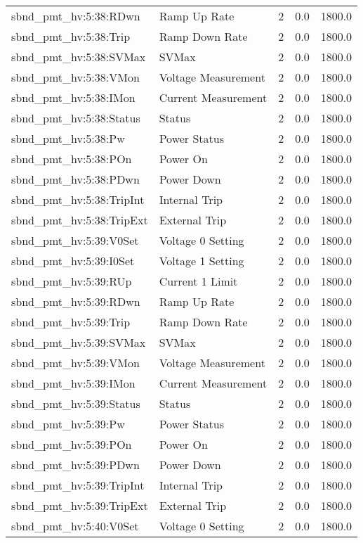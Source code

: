 \begin{center}
\begin{longtable}{l | l l l l }
sbnd\_pmt\_hv:5:38:RDwn & Ramp Up Rate & 2 & 0.0 & 1800.0\\ 
sbnd\_pmt\_hv:5:38:Trip & Ramp Down Rate & 2 & 0.0 & 1800.0\\ 
sbnd\_pmt\_hv:5:38:SVMax & SVMax & 2 & 0.0 & 1800.0\\ 
sbnd\_pmt\_hv:5:38:VMon & Voltage Measurement & 2 & 0.0 & 1800.0\\ 
sbnd\_pmt\_hv:5:38:IMon & Current Measurement & 2 & 0.0 & 1800.0\\ 
sbnd\_pmt\_hv:5:38:Status & Status & 2 & 0.0 & 1800.0\\ 
sbnd\_pmt\_hv:5:38:Pw & Power Status & 2 & 0.0 & 1800.0\\ 
sbnd\_pmt\_hv:5:38:POn & Power On & 2 & 0.0 & 1800.0\\ 
sbnd\_pmt\_hv:5:38:PDwn & Power Down & 2 & 0.0 & 1800.0\\ 
sbnd\_pmt\_hv:5:38:TripInt & Internal Trip & 2 & 0.0 & 1800.0\\ 
sbnd\_pmt\_hv:5:38:TripExt & External Trip & 2 & 0.0 & 1800.0\\ 
sbnd\_pmt\_hv:5:39:V0Set & Voltage 0 Setting & 2 & 0.0 & 1800.0\\ 
sbnd\_pmt\_hv:5:39:I0Set & Voltage 1 Setting & 2 & 0.0 & 1800.0\\ 
sbnd\_pmt\_hv:5:39:RUp & Current 1 Limit & 2 & 0.0 & 1800.0\\ 
sbnd\_pmt\_hv:5:39:RDwn & Ramp Up Rate & 2 & 0.0 & 1800.0\\ 
sbnd\_pmt\_hv:5:39:Trip & Ramp Down Rate & 2 & 0.0 & 1800.0\\ 
sbnd\_pmt\_hv:5:39:SVMax & SVMax & 2 & 0.0 & 1800.0\\ 
sbnd\_pmt\_hv:5:39:VMon & Voltage Measurement & 2 & 0.0 & 1800.0\\ 
sbnd\_pmt\_hv:5:39:IMon & Current Measurement & 2 & 0.0 & 1800.0\\ 
sbnd\_pmt\_hv:5:39:Status & Status & 2 & 0.0 & 1800.0\\ 
sbnd\_pmt\_hv:5:39:Pw & Power Status & 2 & 0.0 & 1800.0\\ 
sbnd\_pmt\_hv:5:39:POn & Power On & 2 & 0.0 & 1800.0\\ 
sbnd\_pmt\_hv:5:39:PDwn & Power Down & 2 & 0.0 & 1800.0\\ 
sbnd\_pmt\_hv:5:39:TripInt & Internal Trip & 2 & 0.0 & 1800.0\\ 
sbnd\_pmt\_hv:5:39:TripExt & External Trip & 2 & 0.0 & 1800.0\\ 
sbnd\_pmt\_hv:5:40:V0Set & Voltage 0 Setting & 2 & 0.0 & 1800.0\\ 

\end{longtable}
\end{center}
